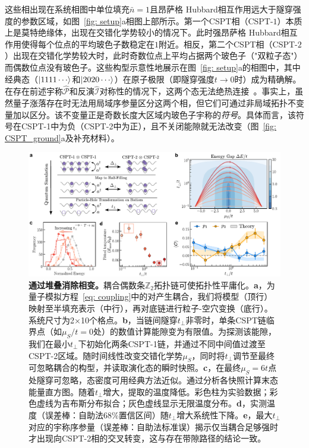 \documentclass[preprint,superscriptaddress,floatfix,nofootinbib]{revtex4-2}
\begin{document}
这些相出现在系统相图中单位填充$\bar{n} =1$且昂萨格 Hubbard相互作用远大于隧穿强度的参数区域，如图~\ref{fig: setup}a相图上部所示。第一个CSPT相（CSPT-$1$）本质上是莫特绝缘体，出现在交错化学势较小的情况下。此时强昂萨格 Hubbard相互作用使得每个位点的平均玻色子数稳定在$1$附近。相反，第二个CSPT相（CSPT-$2$）出现在交错化学势较大时，此时奇数位点上平均占据两个玻色子（"双粒子态"）而偶数位点没有玻色子。这些构型示意性地展示在图~\ref{fig: setup}a的相图中，其中经典态（$\ket{1111\cdots}$和$\ket{2020\cdots}$）在原子极限（即隧穿强度$t\to 0$时）成为精确解。在存在前述宇称$\hat{\mathcal P}$和反演$\hat{\mathcal I}$对称性的情况下，这两个态无法绝热连接~\cite{Fuji2015}。事实上，虽然量子涨落存在时无法用局域序参量区分这两个相\cite{Fuji2015}，但它们可通过非局域拓扑不变量加以区分。该不变量正是奇数长度大区域内玻色子宇称的\textit{符号}。具体而言，该符号在CSPT-1中为负（CSPT-2中为正），且不关闭能隙就无法改变（图~\ref{fig: CSPT_ground}a及补充材料）。
\begin{figure}
    \centering
    \includegraphics[width=\textwidth]{figures/Fig_stacking.pdf}
    \caption{\textbf{通过堆叠消除相变。}耦合偶数条$\mathbb{Z}_2$拓扑链可使拓扑性平庸化。\textbf{a}，为量子模拟方程~\eqref{eq: coupling}中的对产生耦合，我们将模型（顶行）映射至半填充表示（中行），再对底链进行粒子-空穴变换（底行）。系统尺寸为2×10个格点。\textbf{b}，当链间隧穿$t_\perp$非零时，单条CSPT链临界点（如$\mu_S/t = 0$处）的数值计算能隙变为有限值。为探测该能隙，我们在最小$t_\perp$下初始化两条CSPT-1链，并通过不同中间值过渡至CSPT-2区域。随时间线性改变交错化学势$\mu_S$，同时将$t_\perp$调节至最终可忽略耦合的构型，并读取演化态的瞬时快照。\textbf{c}，在最终$\mu_S = 6t$点处隧穿可忽略，态密度可用经典方法近似。通过分析各快照计算末态能量直方图。随着$t_\perp$增大，提取的温度降低。彩色柱为实验数据；彩色虚线为吉布斯分布拟合；灰色虚线显示无限温度分布。\textbf{d}，实测温度（误差棒：自助法68\%置信区间）随$t_\perp$增大系统性下降。\textbf{e}，最大$t_\perp$对应的宇称序参量（误差棒：自助法标准误）揭示仅当耦合足够强时才出现向CSPT-2相的交叉转变，这与存在带隙路径的结论一致。}
    \label{fig: Coupled_CSPT}
\end{figure}
\end{document}
